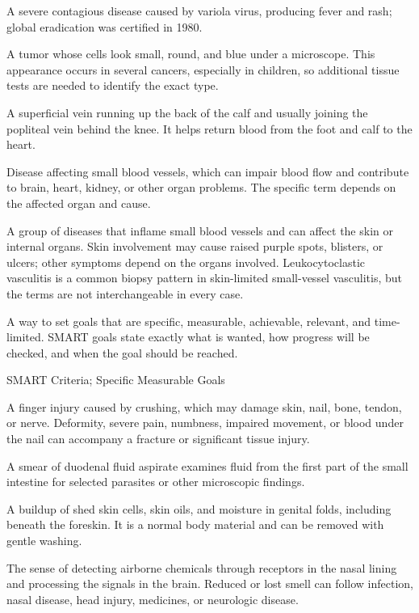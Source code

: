 A severe contagious disease caused by variola virus, producing fever and rash; global eradication was certified in 1980.

 A tumor whose cells look small, round, and blue under a microscope. This appearance occurs in several cancers, especially in children, so additional tissue tests are needed to identify the exact type.

 A superficial vein running up the back of the calf and usually joining the popliteal vein behind the knee. It helps return blood from the foot and calf to the heart.

 Disease affecting small blood vessels, which can impair blood flow and contribute to brain, heart, kidney, or other organ problems. The specific term depends on the affected organ and cause.

 A group of diseases that inflame small blood vessels and can affect the skin or internal organs. Skin involvement may cause raised purple spots, blisters, or ulcers; other symptoms depend on the organs involved. Leukocytoclastic vasculitis is a common biopsy pattern in skin-limited small-vessel vasculitis, but the terms are not interchangeable in every case.

 A way to set goals that are specific, measurable, achievable, relevant, and time-limited. SMART goals state exactly what is wanted, how progress will be checked, and when the goal should be reached.

\synonyms
SMART Criteria; Specific Measurable Goals

 A finger injury caused by crushing, which may damage skin, nail, bone, tendon, or nerve. Deformity, severe pain, numbness, impaired movement, or blood under the nail can accompany a fracture or significant tissue injury.

 A smear of duodenal fluid aspirate examines fluid from the first part of the small intestine for selected parasites or other microscopic findings.

 A buildup of shed skin cells, skin oils, and moisture in genital folds, including beneath the foreskin. It is a normal body material and can be removed with gentle washing.

 The sense of detecting airborne chemicals through receptors in the nasal lining and processing the signals in the brain. Reduced or lost smell can follow infection, nasal disease, head injury, medicines, or neurologic disease.

